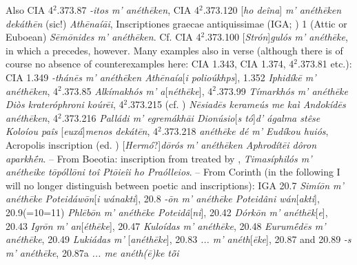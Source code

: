 Also CIA 4$^2$.373.87 \textit{-itos \emph{m'} anéthēken}, CIA 4$^2$.373.120 {[}\textit{ho deîna}{]} \textit{\emph{m'} anéthēken dekáthēn} (sic!) \textit{Athēnaíāi}, Inscriptiones graecae antiquissimae (IGA; \citealp{Roehl1882}) 1 (Attic or Euboean) \textit{Sēmōnides \emph{m'} anéthēken}. Cf. CIA 4$^2$.373.100 {[}\textit{Strón}{]}\textit{gulós \emph{m'} anéthēke}, in which a  precedes, however. Many examples also in verse (although there is of course no absence of counterexamples\label{versedeviations} here: CIA 1.343, CIA 1.374, 4$^2$.373.81 etc.): CIA 1.349 \textit{-thánēs \emph{m'} anéthēken Athēnaía}{[}\textit{i polioúkhps}{]}, 1.352 \textit{Iphidíkē \emph{m'} anéthēken}, 4$^2$.373.85 \textit{Alkímakhós \emph{m'} a}{[}\textit{néthēke}{]}, 4$^2$.373.99 \textit{Tímarkhós \emph{m'} anéthēke Diòs krateróphroni koúrēi}, 4$^2$.373.215 (cf. \citealp[145]{Studniczka1887}) \textit{Nēsiadēs kerameús \emph{me} kaì Andokídēs anéthēken}, 4$^2$.373.216 \textit{Palládi \emph{m'} egremákhāi Dionúsio}{[}\textit{s tó}{]}\textit{d' ágalma stêse Koloíou paîs }{[}\textit{euxá}{]}\textit{menos dekátēn}, 4$^2$.373.218 \textit{anéthēke dé \emph{m'} Eudíkou huiós}, Acropolis inscription (ed. \citealp[160]{Foucart1889}) {[}\textit{Hermó}?{]}\textit{dōrós \emph{m'} anéthēken Aphrodítēi dôron aparkhḗn}. -- From Boeotia: inscription from \citet{Reinach1885} treated by \citet[123--125]{Kretschmer1891}, \textit{Timasíphilós \emph{m'} anétheike tōpóllōni toî Ptōieîi ho Praólleios}. -- From Corinth (in the following I will no longer distinguish between poetic and  inscriptions): IGA 20.7 \textit{Simíōn \emph{m'} anéthēke Poteidáwōn}{[}\textit{i wánakti}{]}, 20.8 \textit{-ōn \emph{m'} anéthēke Poteidâni wán}{[}\textit{akti}{]}, 20.9(=10=11) \textit{Phlēbōn \emph{m'} anéthēke Poteidâ}{[}\textit{ni}{]}, 20.42 \textit{Dórkōn \emph{m'} anéthēk}{[}\textit{e}{]}, 20.43 \textit{Igrōn \emph{m'} an}{[}\textit{éthēke}{]}, 20.47 \textit{Kuloídas \emph{m'} anéthēke}, 20.48 \textit{Eurumḗdēs \emph{m'} anéthēke}, 20.49 \textit{Lukiádas \emph{m'} }{[}\textit{anéthēke}{]}, 20.83 \textit{... \emph{m'} anéth}{[}\textit{ēke}{]}, 20.87 and 20.89 \textit{-s \emph{m'} anéthēke}, 20.87a \textit{... \emph{me} anéth(ē)ke tȭi}
